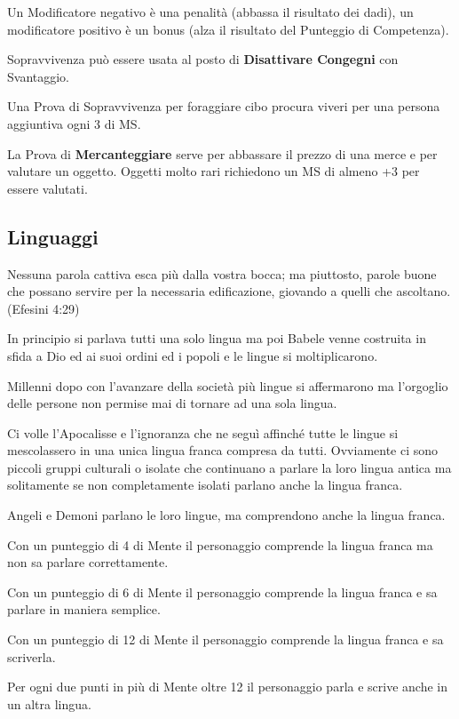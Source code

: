 \documentclass[12pt,a4paper,twoside,openany]{book}
\begin{document}
\begin{multicols}{2}
Un Modificatore negativo è una penalità (abbassa il risultato dei dadi), un modificatore positivo è un bonus (alza il risultato del Punteggio di Competenza).

Sopravvivenza può essere usata al posto di \textbf{Disattivare Congegni} con Svantaggio.

Una Prova di Sopravvivenza per foraggiare cibo procura viveri per una persona aggiuntiva ogni 3 di MS.

\medskip

La Prova di \textbf{Mercanteggiare} serve per abbassare il prezzo di una merce e per valutare un oggetto. Oggetti molto rari richiedono un MS di almeno +3 per essere valutati.

\end{multicols}

\pagebreak

\subsection{Linguaggi}

\begin{changemargin}{0.3cm}{0.3cm}\begin{enfasi}{
Nessuna parola cattiva esca più dalla vostra bocca; ma piuttosto, parole buone che possano servire per la necessaria edificazione, giovando a quelli che ascoltano. (Efesini 4:29)
}\end{enfasi}\end{changemargin}

\begin{multicols}{2}

In principio si parlava tutti una solo lingua ma poi Babele venne costruita in sfida a Dio ed ai suoi ordini ed i popoli e le lingue si moltiplicarono.

Millenni dopo con l'avanzare della società più lingue si affermarono ma l'orgoglio delle persone non permise mai di tornare ad una sola lingua.

Ci volle l'Apocalisse e l'ignoranza che ne seguì affinché tutte le lingue si mescolassero in una unica lingua franca  compresa da tutti. Ovviamente ci sono piccoli gruppi culturali o isolate che continuano a parlare la loro lingua antica ma solitamente se non completamente isolati parlano anche la lingua franca.

Angeli e Demoni parlano le loro lingue, ma comprendono anche la lingua franca.

Con un punteggio di 4 di Mente il personaggio comprende la lingua franca ma non sa parlare correttamente.

Con un punteggio di 6 di Mente il personaggio comprende la lingua franca e sa parlare in maniera semplice.

Con un punteggio di 12 di Mente il personaggio comprende la lingua franca e sa scriverla.

Per ogni due punti in più di Mente oltre 12 il personaggio parla e scrive anche in un altra lingua.
\end{multicols}
\end{document}
